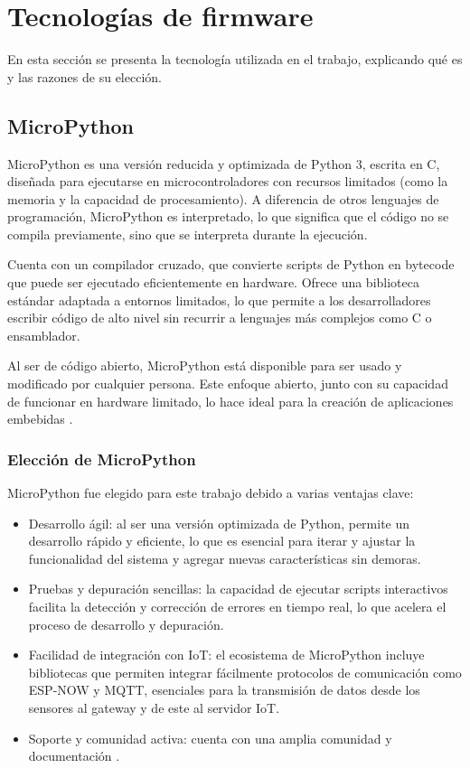 \section{Tecnologías de firmware}

En esta sección se presenta la tecnología utilizada en el trabajo, explicando qué es y las razones de su elección.

\subsection{MicroPython}

MicroPython es una versión reducida y optimizada de Python 3, escrita en C, diseñada para ejecutarse en microcontroladores con recursos limitados (como la memoria y  la capacidad de procesamiento). A diferencia de otros lenguajes de programación, MicroPython es interpretado, lo que significa que el código no se compila previamente, sino que se interpreta durante la ejecución.

Cuenta con un compilador cruzado, que convierte scripts de Python en bytecode que puede ser ejecutado eficientemente en hardware. Ofrece una biblioteca estándar adaptada a entornos limitados, lo que permite a los desarrolladores escribir código de alto nivel sin recurrir a lenguajes más complejos como C o ensamblador.

Al ser de código abierto, MicroPython está disponible para ser usado y modificado por cualquier persona. Este enfoque abierto, junto con su capacidad de funcionar en hardware limitado, lo hace ideal para la creación de aplicaciones embebidas \citep{micropython} \citep{infoMpy}. 

\subsubsection{Elección de MicroPython}
MicroPython fue elegido para este trabajo debido a varias ventajas clave:

\begin{itemize}
    \item Desarrollo ágil: al ser una versión optimizada de Python, permite un desarrollo rápido y eficiente, lo que es esencial para iterar y ajustar la funcionalidad del sistema y agregar nuevas características sin demoras.
    \item Pruebas y depuración sencillas: la capacidad de ejecutar scripts interactivos facilita la detección y corrección de errores en tiempo real, lo que acelera el proceso de desarrollo y depuración.
    \item Facilidad de integración con IoT: el ecosistema de MicroPython incluye bibliotecas que permiten integrar fácilmente protocolos de comunicación como ESP-NOW y MQTT, esenciales para la transmisión de datos  desde los sensores al gateway y de este al servidor IoT.
    \item Soporte y comunidad activa: cuenta con una amplia comunidad y documentación \citep{docsmpy}.
\end{itemize}

